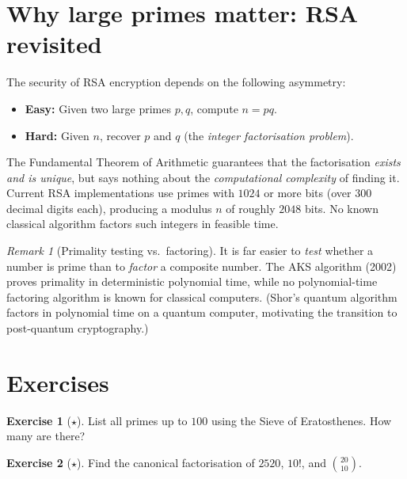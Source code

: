 \documentclass[12pt,a4paper,openany]{book}
\theoremstyle{definition}
\newtheorem{exercise}{Exercise}[chapter]
\theoremstyle{plain}
\theoremstyle{remark}
\newtheorem{remark}[definition]{Remark}
\begin{document}
\section{Why large primes matter: RSA revisited}
\label{sec:rsa-primes}

The security of RSA encryption depends on the following asymmetry:
\begin{itemize}[nosep]
  \item \textbf{Easy:} Given two large primes $p, q$, compute $n = pq$.
  \item \textbf{Hard:} Given $n$, recover $p$ and $q$ (the \emph{integer
        factorisation problem}).
\end{itemize}

The Fundamental Theorem of Arithmetic guarantees that the factorisation
\emph{exists and is unique}, but says nothing about the \emph{computational
complexity} of finding it. Current RSA implementations use primes with $1024$
or more bits (over $300$ decimal digits each), producing a modulus $n$ of
roughly $2048$ bits. No known classical algorithm factors such integers in
feasible time.

\begin{remark}[Primality testing vs.\ factoring]
\label{rem:primality-vs-factor}
It is far easier to \emph{test} whether a number is prime than to \emph{factor}
a composite number. The AKS algorithm (2002) proves primality in deterministic
polynomial time, while no polynomial-time factoring algorithm is known for
classical computers. (Shor's quantum algorithm factors in polynomial time on a
quantum computer, motivating the transition to post-quantum cryptography.)
\end{remark}

\section{Exercises}
\label{sec:ch2-exercises}

\begin{exercise}[$\star$]
\label{exer:ch2-list-primes}
List all primes up to $100$ using the Sieve of Eratosthenes. How many are
there?
\end{exercise}

\begin{exercise}[$\star$]
\label{exer:ch2-fta-factor}
Find the canonical factorisation of $2520$, $10!$, and $\binom{20}{10}$.
\end{exercise}
\end{document}

